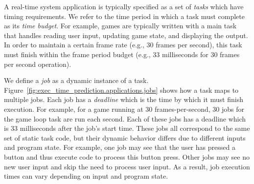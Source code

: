 A real-time system application is typically specified as a set of \emph{tasks}
which have timing requirements. We refer to the time period in which a task
must complete as its \emph{time budget}. For example, games are typically
written with a main task that handles reading user input, updating game state,
and displaying the output. In order to maintain a certain frame rate (e.g., 30
frames per second), this task must finish within the frame period budget (e.g.,
33 milliseconds for 30 frames per second operation).

We define a \emph{job} as a dynamic instance of a task.
Figure~\ref{fig:exec_time_prediction.applications.jobs} shows how a task maps
to multiple jobs. Each job has a \emph{deadline} which is the time by which it must
finish execution. For example, for a game running at 30 frames-per-second, 30
jobs for the game loop task are run each second. Each of these jobs has a
deadline which is 33 milliseconds after the job's start time. These jobs all
correspond to the same set of static task code, but their dynamic behavior
differs due to different inputs and program state. For example, one job may see
that the user has pressed a button and thus execute code to process this button
press. Other jobs may see no new user input and skip the need to process user
input.  As a result, job execution times can vary depending on input and
program state.

